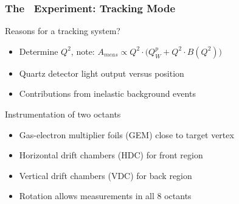 \begin{frame}
 \frametitle{The \Qweak\ Experiment: Tracking Mode}
 \begin{block}{Reasons for a tracking system?}
  \begin{itemize}
   \item \alert{Determine $Q^2$}, note: $A_{meas} \propto Q^2 \cdot \bigl( Q^p_W + Q^2 \cdot B(Q^2) \bigr)$
   \item Quartz detector \alert{light output versus position}
   \item Contributions from \alert{inelastic background events}
  \end{itemize}
 \end{block}
 \begin{center}
 \end{center}
 \begin{block}{Instrumentation of two octants}
  \begin{itemize}
   \item Gas-electron multiplier foils (GEM) close to target vertex
   \item Horizontal drift chambers (HDC) for front region
   \item Vertical drift chambers (VDC) for back region
   \item Rotation allows measurements in all 8 octants
  \end{itemize}
 \end{block}
\end{frame}
